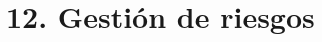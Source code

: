 \documentclass[11pt]{charter}
\begin{document}








\vspace{40em}

\section{12. Gestión de riesgos}
\label{sec:riesgos}
\end{document}
